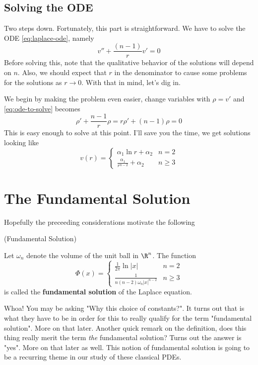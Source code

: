 \documentclass{bkcnotes}
\begin{document}
\subsection{Solving the ODE}
Two steps down. Fortunately, this part is straightforward. We have to
solve the ODE \eqref{eq:laplace-ode}, namely
\begin{equation}
  \label{eq:ode-to-solve}
  v'' + \frac{(n-1)}{r}v' = 0
\end{equation}
Before solving this, note that the qualitative behavior of the
solutions will depend on $n$. Also, we should expect that $r$ in the
denominator to cause some problems for the solutions as $r \to
0$. With that in mind, let's dig in.

We begin by making the problem even easier, change variables with
$\rho = v'$ and \eqref{eq:ode-to-solve} becomes
\begin{equation}
  \label{eq:ode-first-order}
  \rho' + \frac{n-1}{r}\rho = r\rho' + (n-1)\rho = 0
\end{equation}
This is easy enough to solve at this point. I'll save you the time, we
get solutions looking like
\begin{equation}
  \label{eq:ode-soln}
  v(r) =
  \begin{cases}
    \alpha_1\ln{r} + \alpha_2 & n=2 \\
    \frac{\alpha_1}{r^{n-2}} + \alpha_2 & n \geq 3
  \end{cases}
\end{equation}

\section{The Fundamental Solution}
Hopefully the preceeding considerations motivate the following
\begin{ndefn}(Fundamental Solution)

  Let $\omega_n$ denote the volume of the unit ball in $\R^n$. The
  function
  \begin{equation}
    \label{eq:fundamental-solution}
    \Phi(x) =
    \begin{cases}
      \frac{1}{2\pi}\ln{|x|} & n=2 \\
      \frac{1}{n(n-2)\omega_n |x|^{n-2}} & n \geq 3
    \end{cases}
  \end{equation}
  is called the \textbf{fundamental solution} of the Laplace equation.
\end{ndefn}
Whoa! You may be asking "Why this choice of constants?". It turns out
that is what they have to be in order for this to really qualify for
the term "fundamental solution". More on that later. Another quick
remark on the definition, does this thing really merit the term
\emph{the} fundamental solution? Turns out the answer is "yes". More on
that later as well. This notion of fundamental solution is going to be
a recurring theme in our study of these classical PDEs.
\end{document}
